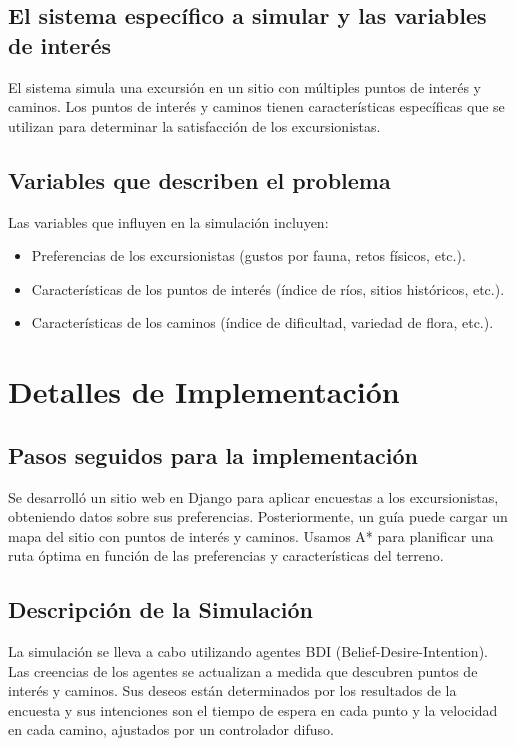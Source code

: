 \documentclass[10pt,twocolumn]{article}
\begin{document}
	\subsection{El sistema específico a simular y las variables de interés}
	El sistema simula una excursión en un sitio con múltiples puntos de interés y caminos. Los puntos de interés y caminos tienen características específicas que se utilizan para determinar la satisfacción de los excursionistas.
	
	\subsection{Variables que describen el problema}
	Las variables que influyen en la simulación incluyen:
	\begin{itemize}
		\item Preferencias de los excursionistas (gustos por fauna, retos físicos, etc.).
		\item Características de los puntos de interés (índice de ríos, sitios históricos, etc.).
		\item Características de los caminos (índice de dificultad, variedad de flora, etc.).
	\end{itemize}
	
	\section{Detalles de Implementación}
	
	\subsection{Pasos seguidos para la implementación}
	Se desarrolló un sitio web en Django para aplicar encuestas a los excursionistas, obteniendo datos sobre sus preferencias. Posteriormente, un guía puede cargar un mapa del sitio con puntos de interés y caminos. Usamos A* para planificar una ruta óptima en función de las preferencias y características del terreno.
	
	\subsection{Descripción de la Simulación}
	La simulación se lleva a cabo utilizando agentes BDI (Belief-Desire-Intention). Las creencias de los agentes se actualizan a medida que descubren puntos de interés y caminos. Sus deseos están determinados por los resultados de la encuesta y sus intenciones son el tiempo de espera en cada punto y la velocidad en cada camino, ajustados por un controlador difuso.
	
\end{document}
